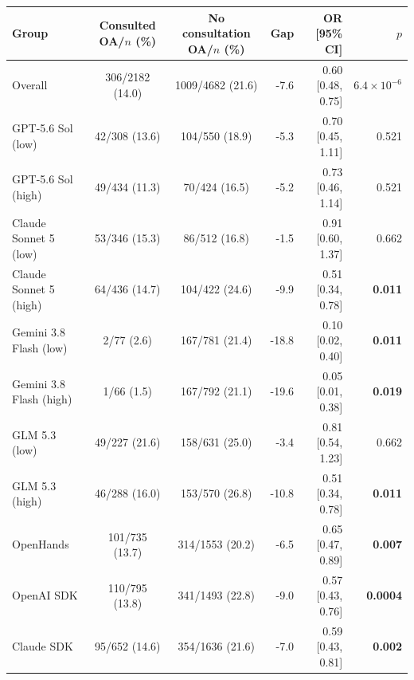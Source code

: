 \begin{tabular}{l cc r r r}
\toprule
Group & Consulted OA/$n$ (\%) & No consultation OA/$n$ (\%) & Gap & OR [95\% CI] & $p$ \\
\midrule
Overall & 306/2182 (14.0) & 1009/4682 (21.6) & -7.6 & 0.60 [0.48, 0.75] & {\boldmath $6.4\times10^{-6}$} \\
\midrule
GPT-5.6 Sol (low) & 42/308 (13.6) & 104/550 (18.9) & -5.3 & 0.70 [0.45, 1.11] & 0.521 \\
GPT-5.6 Sol (high) & 49/434 (11.3) & 70/424 (16.5) & -5.2 & 0.73 [0.46, 1.14] & 0.521 \\
Claude Sonnet 5 (low) & 53/346 (15.3) & 86/512 (16.8) & -1.5 & 0.91 [0.60, 1.37] & 0.662 \\
Claude Sonnet 5 (high) & 64/436 (14.7) & 104/422 (24.6) & -9.9 & 0.51 [0.34, 0.78] & \textbf{0.011} \\
Gemini 3.8 Flash (low) & 2/77 (2.6) & 167/781 (21.4) & -18.8 & 0.10 [0.02, 0.40] & \textbf{0.011} \\
Gemini 3.8 Flash (high) & 1/66 (1.5) & 167/792 (21.1) & -19.6 & 0.05 [0.01, 0.38] & \textbf{0.019} \\
GLM 5.3 (low) & 49/227 (21.6) & 158/631 (25.0) & -3.4 & 0.81 [0.54, 1.23] & 0.662 \\
GLM 5.3 (high) & 46/288 (16.0) & 153/570 (26.8) & -10.8 & 0.51 [0.34, 0.78] & \textbf{0.011} \\
\midrule
OpenHands & 101/735 (13.7) & 314/1553 (20.2) & -6.5 & 0.65 [0.47, 0.89] & \textbf{0.007} \\
OpenAI SDK & 110/795 (13.8) & 341/1493 (22.8) & -9.0 & 0.57 [0.43, 0.76] & \textbf{0.0004} \\
Claude SDK & 95/652 (14.6) & 354/1636 (21.6) & -7.0 & 0.59 [0.43, 0.81] & \textbf{0.002} \\
\bottomrule
\end{tabular}